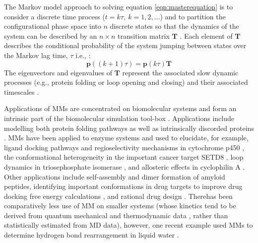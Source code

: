 The Markov model approach to solving equation \ref{eqn:masterequation} is to consider a discrete time process ($t = k\tau,\ k = 1, 2, \ldots$) and to partition the configurational phase space into $n$ discrete states so that  the dynamics of the system can be described by an $n\times n$ transition matrix $\mathbf{T}$ \cite{prinzMarkovModelsMolecular2011}. Each element of $\mathbf{T}$ describes the conditional probability of the system jumping between states over the Markov lag time, $\tau$ i.e., \cite{noeTransitionNetworksModeling2008}: 
\begin{equation}\label{eqn:discretemasterequation}
    \mathbf{p}((k+1)\tau) = \mathbf{p}(k\tau)\mathbf{T}
\end{equation}
The eigenvectors and eigenvalues of $\mathbf{T}$ represent the associated slow dynamic processes (e.g., protein folding or loop opening and closing) and their associated timescales \cite{prinzMarkovModelsMolecular2011}. 

Applications of MMs are concentrated on biomolecular systems and form an intrinsic part of the biomolecular simulation tool-box \cite{hugginsBiomolecularSimulationsDynamics2019}. Applications include modelling both protein folding pathways \cite{singhalUsingPathSampling2004,swopeDescribingProteinFolding2004} as well as intrinsically discorded proteins \cite{schorAnalyticalMethodsStructural2016a}. 
MMs have been applied to enzyme systems and used to elucidate, for example, ligand docking pathways \cite{ahalawatMappingSubstrateRecognition2018a} and regioselectivity mechanisms in cytochrome p450 \cite{dodaniDiscoveryRegioselectivitySwitch2016a}, the conformational heterogeneity in the important cancer target SETD8 \cite{chenDynamicConformationalLandscape2019a}, loop dynamics in triosephosphate isomerase \cite{LoopMotionTriosephosphate}, and allosteric effects in cyclophilin A \cite{wapeesittipanAllostericEffectsCyclophilin2019}. Other applications include self-assembly \cite{senguptaAutomatedMarkovState2019} and dimer formation \cite{leahyCoarseMasterEquations2016} of amyloid peptides, identifying important conformations in drug targets to improve drug docking free energy calculations \cite{amaroEnsembleDockingDrug2018}, and rational drug design \cite{gervasioBiomolecularSimulationsStructureBased2019}. Therehas been comparatively less use of MM on smaller systems (whose kinetics tend to be derived from quantum mechanical and thermodynamic data \cite{glowackiMESMEROpenSourceMaster2012, pillingMasterEquationModels2003}, rather than statistically estimated from MD data), however, one recent example used MMs to determine hydrogen bond rearrangement in liquid water \cite{schulzCollectiveHydrogenbondRearrangement2018}. 


